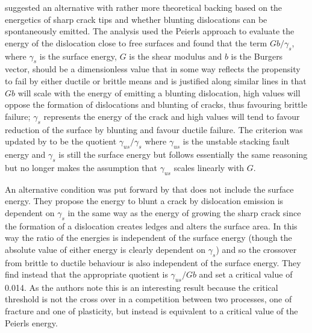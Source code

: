 


\citet{rice1974} suggested an alternative with rather more theoretical backing based on the energetics of sharp crack tips and whether blunting dislocations can be spontaneously emitted. The analysis used the Peierls approach to evaluate the energy of the dislocation close to free surfaces and found that the term $Gb/\gamma_s$, where $\gamma_s$ is the surface energy, $G$ is the shear modulus and $b$ is the Burgers vector, should be a dimensionless value that in some way reflects the propensity to fail by either ductile or brittle means and is justified along similar lines in that $Gb$ will scale with the energy of emitting a blunting dislocation, high values will oppose the formation of dislocations and blunting of cracks, thus favouring brittle failure; $\gamma_s$ represents the energy of the crack and high values will tend to favour reduction of the surface by blunting and favour ductile failure. The criterion was updated by \citet{Rice1992} to be the quotient $\gamma_{us}/ \gamma_s$ where $\gamma_{us}$ is the unstable stacking fault energy and $\gamma_s$ is still the surface energy but follows essentially the same reasoning but no longer makes the assumption that $\gamma_{us}$ scales linearly with $G$.

An alternative condition was put forward by \citet{Zhou1994} that does not include the surface energy. They propose the energy to blunt a crack by dislocation emission is dependent on $\gamma_s$ in the same way as the energy of growing the sharp crack since the formation of a dislocation creates ledges and alters the surface area. In this way the ratio of the energies is independent of the surface energy (though the absolute value of either energy is clearly dependent on $\gamma_s$) and so the crossover from brittle to ductile behaviour is also independent of the surface energy. They find instead that the appropriate quotient is $\gamma_{us} / Gb$ and set a critical value of 0.014. As the authors note this is an interesting result because the critical threshold is not the cross over in a competition between two processes, one of fracture and one of plasticity, but instead is equivalent to a critical value of the Peierls energy.

